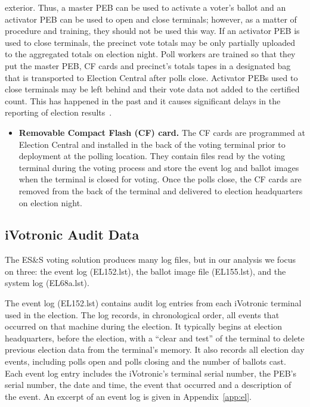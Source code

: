 exterior. Thus, a master PEB can be used to activate a voter's ballot
and an activator PEB can be used to open and close terminals; however,
as a matter of procedure and training, they should not be used this
way. If an activator PEB is used to close terminals, the precinct vote
totals may be only partially uploaded to the aggregated totals on
election night. Poll workers are trained so that they put the master
PEB, CF cards and precinct's totals tapes in a designated bag that is
transported to Election Central after polls close.  Activator PEBs
used to close terminals may be left behind and their vote data not
added to the certified count. This has happened in the past and it causes
significant delays in the reporting of election
results~\cite{Buell2011,Mazella2002}.  

\begin{itemize}
\item \textbf{Removable Compact Flash (CF) card.} The CF cards are
  programmed at Election Central and installed in the back of the
  voting terminal prior to deployment at the polling location. They contain files
  read by the voting terminal during the voting process and store the event log
  and ballot images when the terminal is closed for voting. Once the polls 
  close, the CF cards are removed from the back of the terminal and
  delivered to election headquarters on election night.  
\end{itemize}

\subsection{iVotronic Audit Data}
\smvertspace
The ES\&S voting solution produces many log files, but in our analysis we focus
on three: the event log (EL152.lst), the ballot image file (EL155.lst), and the
system log  (EL68a.lst).    

The event log (EL152.lst) contains audit log entries from each
iVotronic terminal used in the election.  The log  records, in
chronological order, all events that occurred on that machine during the
election. It typically begins at election headquarters, before the
election, with a \textquotedblleft clear and
test\textquotedblright \hspace{1 mm} of the terminal to delete
previous election data from the terminal's memory. It also records all
election day events, including polls open and polls closing and the
number of ballots cast.  Each event log entry includes the iVotronic's
terminal serial number, the PEB's serial number, the date and time,
the event that occurred and a description of the event. An excerpt of
an event log is given in  Appendix~\ref{app:el}. 
 
